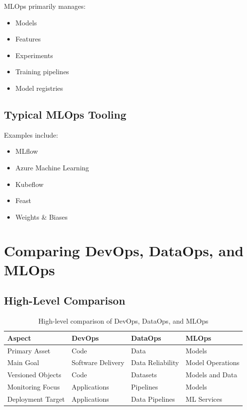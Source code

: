 MLOps primarily manages:

\begin{itemize}
    \item Models
    \item Features
    \item Experiments
    \item Training pipelines
    \item Model registries
\end{itemize}

\subsection{Typical MLOps Tooling}

Examples include:

\begin{itemize}
    \item MLflow
    \item Azure Machine Learning
    \item Kubeflow
    \item Feast
    \item Weights \& Biases
\end{itemize}

\section{Comparing DevOps, DataOps, and MLOps}

\subsection{High-Level Comparison}

\begin{table}[h]
\centering
\begin{tabular}{p{3cm}p{3cm}p{3cm}p{3cm}}
\toprule
Aspect & DevOps & DataOps & MLOps \\
\midrule
Primary Asset & Code & Data & Models \\
Main Goal & Software Delivery & Data Reliability & Model Operations \\
Versioned Objects & Code & Datasets & Models and Data \\
Monitoring Focus & Applications & Pipelines & Models \\
Deployment Target & Applications & Data Pipelines & ML Services \\
\bottomrule
\end{tabular}
\caption{High-level comparison of DevOps, DataOps, and MLOps}
\end{table}

